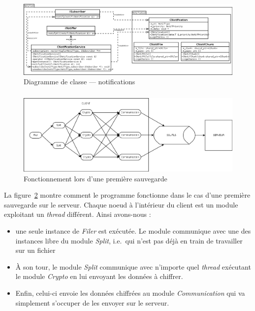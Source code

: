 \documentclass[a4paper,10pt, twoside]{report}
\begin{document}
\begin{spacing}{1.2}
\begin{figure}[h!]
  \hspace{-4.5em}
  \includegraphics[width=19cm]{softwareDesign/classDiagramNotif.png}
  \caption{\label{classDiagramNotif} Diagramme de classe --- notifications}
\end{figure}

\subparagraph{}
\begin{figure}[h!]
  \hspace{-1.5em}
  \includegraphics[width=17cm]{softwareDesign/moduleInteraction.png}
  \caption{\label{interactModule} Fonctionnement lors d'une premi\`ere
  sauvegarde}
\end{figure}

La figure~\ref{interactModule} montre comment le programme fonctionne dans le
cas d'une premi\`ere sauvegarde sur le serveur. Chaque noeud \`a l'int\'erieur
du client est un module exploitant un \textit{thread} diff\'erent. Ainsi
avons-nous :
\begin{itemize}
 \item une seule instance de \textit{Filer} est ex\'ecut\'ee. Le module
 communique avec une des instances libre du module \textit{Split}, i.e.~qui
 n'est pas d\'ej\`a en train de travailler sur un fichier
 \item \`A son tour, le module \textit{Split} communique avec n'importe quel
 \textit{thread} ex\'ecutant le module \textit{Crypto} en lui envoyant les
 donn\'ees \`a chiffrer.
 \item Enfin, celui-ci envoie les donn\'ees chiffr\'ees au module
 \textit{Communication} qui va simplement s'occuper de les envoyer sur le
 serveur.
\end{itemize}


\end{spacing}
\end{document}
